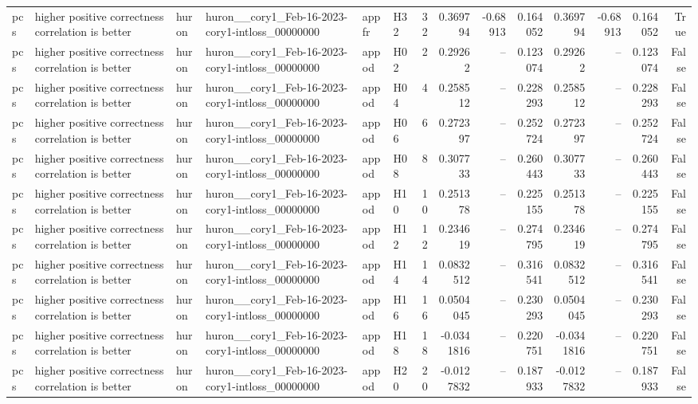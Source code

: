 \begin{longtable}{llllllrrrrrrrr}
pcs & higher positive correctness correlation is better & huron & huron\_\_cory1\_Feb-16-2023-cory1-intloss\_00000000 & appfr & H32 & 32 & 0.369794 & -0.68913 & 0.164052 & 0.369794 & -0.68913 & 0.164052 & True \\
pcs & higher positive correctness correlation is better & huron & huron\_\_cory1\_Feb-16-2023-cory1-intloss\_00000000 & appod & H02 & 2 & 0.29262 & -- & 0.123074 & 0.29262 & -- & 0.123074 & False \\
pcs & higher positive correctness correlation is better & huron & huron\_\_cory1\_Feb-16-2023-cory1-intloss\_00000000 & appod & H04 & 4 & 0.258512 & -- & 0.228293 & 0.258512 & -- & 0.228293 & False \\
pcs & higher positive correctness correlation is better & huron & huron\_\_cory1\_Feb-16-2023-cory1-intloss\_00000000 & appod & H06 & 6 & 0.272397 & -- & 0.252724 & 0.272397 & -- & 0.252724 & False \\
pcs & higher positive correctness correlation is better & huron & huron\_\_cory1\_Feb-16-2023-cory1-intloss\_00000000 & appod & H08 & 8 & 0.307733 & -- & 0.260443 & 0.307733 & -- & 0.260443 & False \\
pcs & higher positive correctness correlation is better & huron & huron\_\_cory1\_Feb-16-2023-cory1-intloss\_00000000 & appod & H10 & 10 & 0.251378 & -- & 0.225155 & 0.251378 & -- & 0.225155 & False \\
pcs & higher positive correctness correlation is better & huron & huron\_\_cory1\_Feb-16-2023-cory1-intloss\_00000000 & appod & H12 & 12 & 0.234619 & -- & 0.274795 & 0.234619 & -- & 0.274795 & False \\
pcs & higher positive correctness correlation is better & huron & huron\_\_cory1\_Feb-16-2023-cory1-intloss\_00000000 & appod & H14 & 14 & 0.0832512 & -- & 0.316541 & 0.0832512 & -- & 0.316541 & False \\
pcs & higher positive correctness correlation is better & huron & huron\_\_cory1\_Feb-16-2023-cory1-intloss\_00000000 & appod & H16 & 16 & 0.0504045 & -- & 0.230293 & 0.0504045 & -- & 0.230293 & False \\
pcs & higher positive correctness correlation is better & huron & huron\_\_cory1\_Feb-16-2023-cory1-intloss\_00000000 & appod & H18 & 18 & -0.0341816 & -- & 0.220751 & -0.0341816 & -- & 0.220751 & False \\
pcs & higher positive correctness correlation is better & huron & huron\_\_cory1\_Feb-16-2023-cory1-intloss\_00000000 & appod & H20 & 20 & -0.0127832 & -- & 0.187933 & -0.0127832 & -- & 0.187933 & False \\

\end{longtable}
